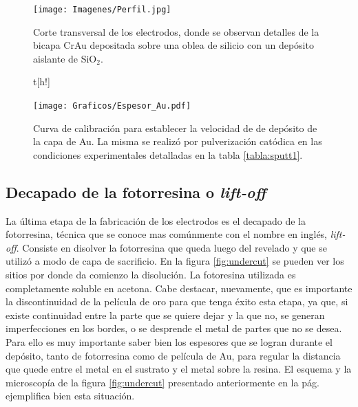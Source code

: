 						  \begin{figure}[th!]
						  \begin{center}
						  \texttt{[image: Imagenes/Perfil.jpg]}
						  \caption[Sección trasversal de los eletrodos]{Corte transversal de los electrodos, donde se observan detalles de la bicapa Cr\textbar Au depositada sobre una oblea de silicio con un depósito aislante de SiO$_2$.}
						  \label{fig:FIB_electrodos}
						  \end{center}
						  \end{figure} 	

					   		\begin{figure}t[h!]
					   		\begin{center}
							\texttt{[image: Graficos/Espesor\_Au.pdf]}
							\caption[Curva de calibración para el espesor de los electrodos]{Curva de calibración para establecer la velocidad de de depósito de la capa de Au. La misma se realizó por pulverización catódica en las condiciones experimentales detalladas en la tabla \ref{tabla:sputt1}.}
							\label{fig:calibracionAu}
							\end{center}
							\end{figure}		  
		
	\subsection{Decapado de la fotorresina o\textit{ lift-off}}

		 La última etapa de la fabricación de los electrodos es el decapado de la fotorresina, técnica que se conoce mas comúnmente con el nombre en inglés, \textit{lift-off}. Consiste en disolver la fotorresina que queda luego del revelado y que se utilizó a modo de capa de sacrificio. En la figura \ref{fig:undercut} se pueden ver los sitios por donde da comienzo la disolución. La fotoresina utilizada es completamente soluble en acetona. Cabe destacar, nuevamente, que es importante la discontinuidad de la película de oro para que tenga éxito esta etapa, ya que, si existe continuidad entre la parte que se quiere dejar y la que no, se generan imperfecciones en los bordes, o se desprende el metal de partes que no se desea. Para ello es muy importante saber bien los espesores que se logran durante el depósito, tanto de fotorresina como de película de Au, para regular la distancia que quede entre el metal en el sustrato y el metal sobre la resina. El esquema y la microscopía de la figura \ref{fig:undercut} presentado anteriormente en la pág. \pageref{fig:undercut} ejemplifica bien esta situación.

